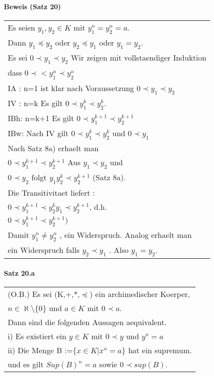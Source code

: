 \documentclass{scrartcl}
\begin{document}
\paragraph{Beweis (Satz 20)}
\begin{tabbing}
\begin{tabular}{l}
Es seien $y_1,y_2 \in K$ mit $y^n_1 = y^n_2 = a$.\\
Dann $y_1 \preceq y_2$ oder $y_2 \preceq y_1$ oder $ y_1 = y_2$.\\
Es sei $0\prec y_1 \prec y_2$ Wir zeigen mit vollstaendiger Induktion\\
dass $0 \prec <y^n_1 \prec y^n_2$\\
IA : n=1 ist klar nach Voraussetzung $ 0 \prec y_1 \prec y_2 $\\
IV : n=k Es gilt $ 0 \prec y^k_1 \prec y^k_2$.\\
IBh: n=k+1 Es gilt $0 \prec y^{k+1}_1 \prec y^{k+1}_2$\\
IBw: Nach IV gilt $0 \prec y^k_1 \prec y^k_2$ und $0\prec y_1$ \\
Nach Satz 8a) erhaelt man\\
$0 \prec y^{k+1}_1 \prec y^{k+1}_2$ Aus $y_1 \prec y_2$ und\\
$0 \prec y_2$ folgt $ y_1y_2^k \prec y_2^{k+1} $ (Satz 8a). \\
Die Transitivitaet liefert :\\
$0 \prec y_1^{k+1} \prec y_2^ky_1\prec y_2^{k+1}$, d.h.\\
$0\prec y_1^{k+1} \prec y_2^{k+1})$\\
Damit $y_1^n \neq y_2^n$ , ein Widerspruch. Analog erhaelt man\\
ein Widerspruch falls $y_2 \prec y_1$ . Also $y_1 = y_2$.
\end{tabular}
\end{tabbing}

\paragraph{Satz 20.a}
\begin{tabbing}
\begin{tabular}{l}
(O.B.) Es sei (K,+,*,$\preceq$) ein archimedischer Koerper,\\
$n\in \aleph \setminus \{ 0\}$ und $a\in K$ mit $0\prec a$.\\
Dann sind die folgenden Aussagen aequivalent.\\
i) Es existiert ein $y\in K$ mit $0\prec y$ und $y^n=a$\\
ii) Die Menge B :=$\{ x\in K| x^n=a\}$ hat ein supremum.\\
und es gilt $Sup(B)^n=a$ sowie $0\prec sup(B)$.\\
\end{tabular}
\end{tabbing}
\end{document}
